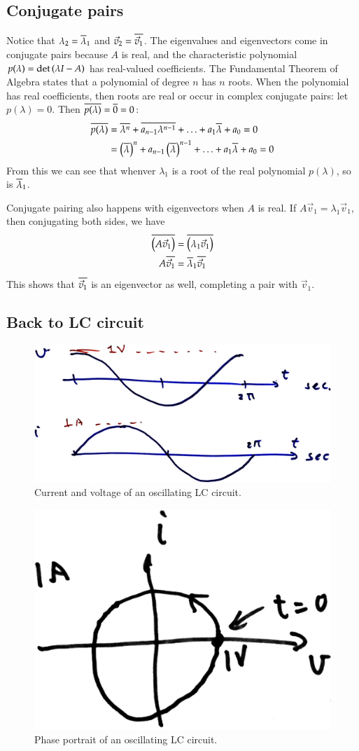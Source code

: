 \subsection{Conjugate pairs}
Notice that \(\lambda_2 = \overline \lambda_1\) and \(\vec v_2 = \overline{\vec v_1}\).
The eigenvalues and eigenvectors come in conjugate pairs because \(A\) is real, and the characteristic polynomial \(p(\lambda) = \det\del{\lambda I - A}\) has real-valued coefficients.
The Fundamental Theorem of Algebra states that a polynomial of degree \(n\) has \(n\) roots.
When the polynomial has real coefficients, then roots are real or occur in complex conjugate pairs:
let \(p(\lambda) = 0\).
Then \(\overline{p(\lambda)} = \overline{0} = 0\):
\begin{align}
  \conj{p(\lambda)}
  &= \conj{\lambda^n} + \conj{a_{n-1} \lambda^{n-1}} + \ldots + a_1 \conj{\lambda} + a_0 =0\\
  &= \del{\conj{\lambda}}^n + a_{n-1} \del{\conj{\lambda}}^{n-1}
+ \ldots + a_1 \conj{\lambda} + a_0 =0
\end{align}
From this we can see that whenver \(\lambda_1\) is a root of the real polynomial \(p(\lambda)\), so is \(\overline{\lambda}_1\).

Conjugate pairing also happens with eigenvectors when \(A\) is real.
If \(A \vec v_1 = \lambda_1 \vec v_1\), then conjugating both sides, we have
\begin{align}
  \conj{\del{A \vec v_1}}
  &= \conj{\del{\lambda_1 \vec v_1}}\\
  A \conj {\vec v_1}
  &= \conj \lambda_1 \conj{\vec v_1}
\end{align}
This shows that \(\overline{\vec v_1}\) is an eigenvector as well, completing a pair with \(\vec v_1\).

\subsection{Back to LC circuit}
\begin{figure}
  \centering
  \includegraphics[width=0.6\linewidth]{figures/7/LC-vi}
  \caption{Current and voltage of an oscillating LC circuit.}
  \label{figure:lec7-LC-vi}
\end{figure}
\begin{figure}
  \centering
  \includegraphics[width=0.3\linewidth]{figures/7/LC-iv-parametric}
  \caption{Phase portrait of an oscillating LC circuit.}
  \label{figure:lec7-iv-parametric}
\end{figure}

